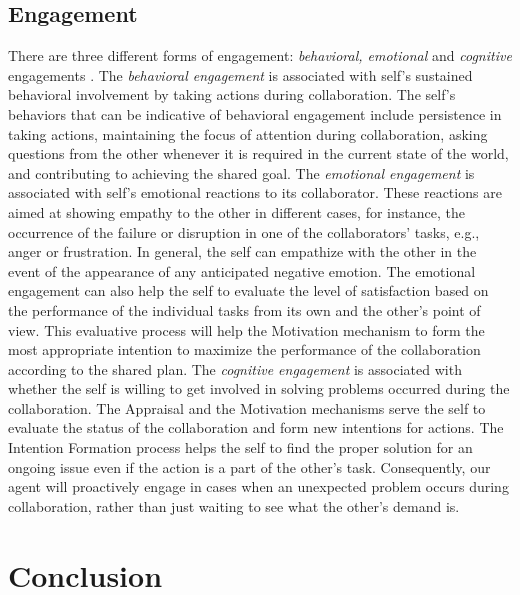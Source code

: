\documentclass[letterpaper]{article}
\begin{document}
\subsection{Engagement} There are three different forms of engagement:
\textit{behavioral, emotional} and \textit{cognitive} engagements
\cite{appleton:engagement}. The \textit{behavioral engagement} is associated
with self's sustained behavioral involvement by taking actions during
collaboration. The self's behaviors that can be indicative of behavioral
engagement include persistence in taking actions, maintaining the focus of
attention during collaboration, asking questions from the other whenever
it is required in the current state of the world, and contributing to achieving
the shared goal. The \textit{emotional engagement} is associated with self's
emotional reactions to its collaborator. These reactions are aimed at showing
empathy to the other in different cases, for instance, the occurrence of
the failure or disruption in one of the collaborators' tasks, e.g., anger or
frustration. In general, the self can empathize with the other in the
event of the appearance of any anticipated negative emotion. The emotional
engagement can also help the self to evaluate the level of satisfaction based
on the performance of the individual tasks from its own and the other's
point of view. This evaluative process will help the Motivation mechanism to
form the most appropriate intention to maximize the performance of the
collaboration according to the shared plan. The \textit{cognitive engagement} is
associated with whether the self is willing to get involved in solving problems
occurred during the collaboration. The Appraisal and the Motivation mechanisms
serve the self to evaluate the status of the collaboration and form new
intentions for actions. The Intention Formation process helps the self to find
the proper solution for an ongoing issue even if the action is a part of the
other's task. Consequently, our agent will proactively engage in cases
when an unexpected problem occurs during collaboration, rather than just waiting
to see what the other's demand is.

\section{Conclusion}



\end{document}
